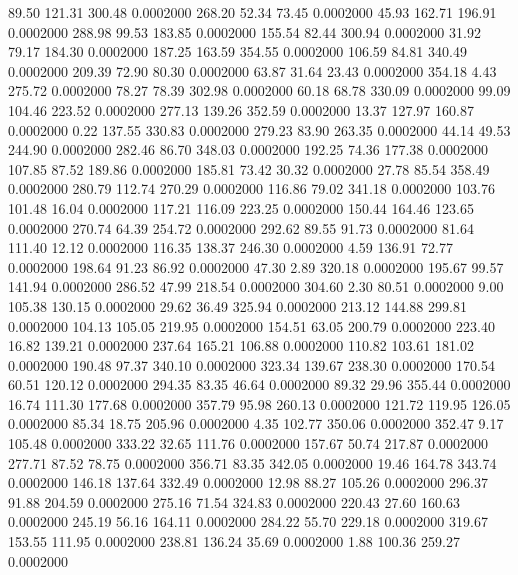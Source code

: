   89.50  121.31  300.48   0.0002000
 268.20   52.34   73.45   0.0002000
  45.93  162.71  196.91   0.0002000
 288.98   99.53  183.85   0.0002000
 155.54   82.44  300.94   0.0002000
  31.92   79.17  184.30   0.0002000
 187.25  163.59  354.55   0.0002000
 106.59   84.81  340.49   0.0002000
 209.39   72.90   80.30   0.0002000
  63.87   31.64   23.43   0.0002000
 354.18    4.43  275.72   0.0002000
  78.27   78.39  302.98   0.0002000
  60.18   68.78  330.09   0.0002000
  99.09  104.46  223.52   0.0002000
 277.13  139.26  352.59   0.0002000
  13.37  127.97  160.87   0.0002000
   0.22  137.55  330.83   0.0002000
 279.23   83.90  263.35   0.0002000
  44.14   49.53  244.90   0.0002000
 282.46   86.70  348.03   0.0002000
 192.25   74.36  177.38   0.0002000
 107.85   87.52  189.86   0.0002000
 185.81   73.42   30.32   0.0002000
  27.78   85.54  358.49   0.0002000
 280.79  112.74  270.29   0.0002000
 116.86   79.02  341.18   0.0002000
 103.76  101.48   16.04   0.0002000
 117.21  116.09  223.25   0.0002000
 150.44  164.46  123.65   0.0002000
 270.74   64.39  254.72   0.0002000
 292.62   89.55   91.73   0.0002000
  81.64  111.40   12.12   0.0002000
 116.35  138.37  246.30   0.0002000
   4.59  136.91   72.77   0.0002000
 198.64   91.23   86.92   0.0002000
  47.30    2.89  320.18   0.0002000
 195.67   99.57  141.94   0.0002000
 286.52   47.99  218.54   0.0002000
 304.60    2.30   80.51   0.0002000
   9.00  105.38  130.15   0.0002000
  29.62   36.49  325.94   0.0002000
 213.12  144.88  299.81   0.0002000
 104.13  105.05  219.95   0.0002000
 154.51   63.05  200.79   0.0002000
 223.40   16.82  139.21   0.0002000
 237.64  165.21  106.88   0.0002000
 110.82  103.61  181.02   0.0002000
 190.48   97.37  340.10   0.0002000
 323.34  139.67  238.30   0.0002000
 170.54   60.51  120.12   0.0002000
 294.35   83.35   46.64   0.0002000
  89.32   29.96  355.44   0.0002000
  16.74  111.30  177.68   0.0002000
 357.79   95.98  260.13   0.0002000
 121.72  119.95  126.05   0.0002000
  85.34   18.75  205.96   0.0002000
   4.35  102.77  350.06   0.0002000
 352.47    9.17  105.48   0.0002000
 333.22   32.65  111.76   0.0002000
 157.67   50.74  217.87   0.0002000
 277.71   87.52   78.75   0.0002000
 356.71   83.35  342.05   0.0002000
  19.46  164.78  343.74   0.0002000
 146.18  137.64  332.49   0.0002000
  12.98   88.27  105.26   0.0002000
 296.37   91.88  204.59   0.0002000
 275.16   71.54  324.83   0.0002000
 220.43   27.60  160.63   0.0002000
 245.19   56.16  164.11   0.0002000
 284.22   55.70  229.18   0.0002000
 319.67  153.55  111.95   0.0002000
 238.81  136.24   35.69   0.0002000
   1.88  100.36  259.27   0.0002000

